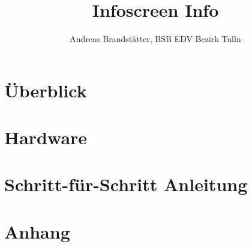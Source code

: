 \documentclass[12pt,a4paper,titlepage,twoside,bibtotocnumbered,liststotocnumbered]{scrreprt}
\begin{document}
\maketitle
\setcounter{section}{0}
\setcounter{tocdepth}{2}
\tableofcontents
\pagebreak

\title{Infoscreen Info}
\author{Andreas Brandstätter, BSB EDV Bezirk Tulln}

\newcommand{\isDraft}{true}

\chapter{Überblick}


\chapter{Hardware}


\chapter{Schritt-für-Schritt Anleitung}


\chapter{Anhang}


\listoffigures
\printbibliography 
\end{document}

